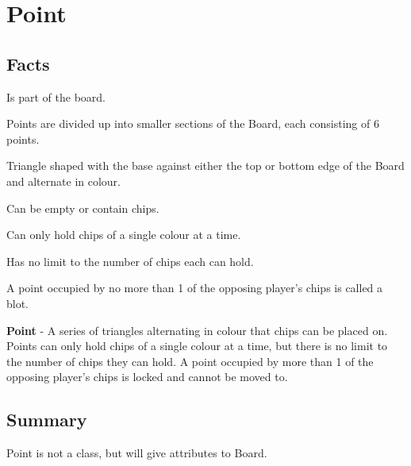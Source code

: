 \section{Point}

\subsection{Facts}

\begin{dashed}
    \item Is part of the board.
    \item Points are divided up into smaller sections of the Board, each consisting of 6 points.
    \item Triangle shaped with the base against either the top or bottom edge of the Board and alternate in colour.
    \item Can be empty or contain chips.
    \item Can only hold chips of a single colour at a time.
    \item Has no limit to the number of chips each can hold.
    \item A point occupied by no more than 1 of the opposing player’s chips is called a blot.
\end{dashed}

\noindent
\newline \textbf{Point} - A series of triangles alternating in
colour that chips can be placed on. Points can only hold chips
of a single colour at a time, but there is no limit to the number
of chips they can hold. A point occupied by more than 1 of the
opposing player's chips is locked and cannot be moved to.

\subsection{Summary}
Point is not a class, but will give attributes to Board.
